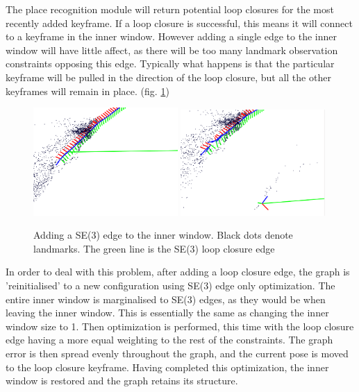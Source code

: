 The place recognition module will return potential loop closures for the most recently added keyframe.  If a loop closure is successful, this means it will connect to a keyframe in the inner window.  However adding a single edge to the inner window will have little affect, as there will be too many landmark observation constraints opposing this edge.  Typically what happens is that the particular keyframe will be pulled in the direction of the loop closure, but all the other keyframes will remain in place. (fig. \ref{fig:graph_fail})

\begin{figure}[H]
  \centering
    \includegraphics[width=0.49\textwidth]{chapters/images/before_opt}
    \includegraphics[width=0.49\textwidth]{chapters/images/after_opt}
  \caption{Adding a SE(3) edge to the inner window.  Black dots denote landmarks.  The green line is the SE(3) loop closure edge}
  \label{fig:graph_fail}
\end{figure}

In order to deal with this problem, after adding a loop closure edge, the graph is 'reinitialised' to a new configuration using SE(3) edge only optimization.  The entire inner window is marginalised to SE(3) edges, as they would be when leaving the inner window.  This is essentially the same as changing the inner window size to 1.  Then optimization is performed, this time with the loop closure edge having a more equal weighting to the rest of the constraints.  The graph error is then spread evenly throughout the graph, and the current pose is moved to the loop closure keyframe.  Having completed this optimization, the inner window is restored and the graph retains its structure.

